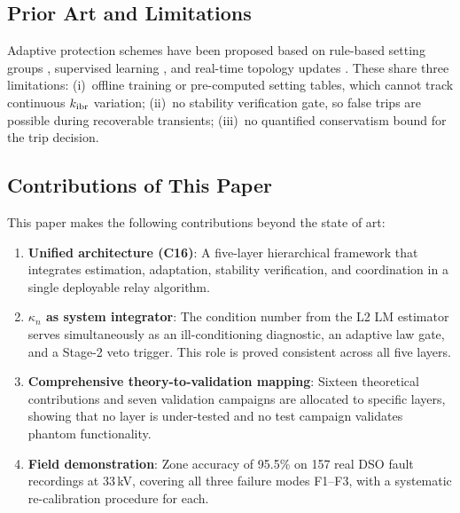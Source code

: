 \documentclass[journal,twoside,10pt]{IEEEtran}
\newcommand{\kappan}{\kappa_{n}}
\newcommand{\kibr}{k_{\rm ibr}}
\begin{document}
\subsection{Prior Art and Limitations}

Adaptive protection schemes have been proposed based on rule-based
setting groups \cite{saldarriaga2020challenges}, supervised learning
\cite{pan2020deep}, and real-time topology updates
\cite{dewadasa2011protection}.  These share three limitations:
(i)~offline training or pre-computed setting tables, which cannot
track continuous $\kibr$ variation; (ii)~no stability verification
gate, so false trips are possible during recoverable transients;
(iii)~no quantified conservatism bound for the trip decision.

\subsection{Contributions of This Paper}

This paper makes the following contributions beyond the state of art:

\begin{enumerate}
  \item \textbf{Unified architecture (C16)}: A five-layer hierarchical
        framework that integrates estimation, adaptation, stability
        verification, and coordination in a single deployable relay
        algorithm.

  \item \textbf{$\kappan$ as system integrator}: The condition number
        from the L2 LM estimator serves simultaneously as an
        ill-conditioning diagnostic, an adaptive law gate, and a
        Stage-2 veto trigger.  This role is proved consistent across
        all five layers.

  \item \textbf{Comprehensive theory-to-validation mapping}: Sixteen
        theoretical contributions and seven validation campaigns are
        allocated to specific layers, showing that no layer is
        under-tested and no test campaign validates phantom
        functionality.

  \item \textbf{Field demonstration}: Zone accuracy of 95.5\% on
        157 real DSO fault recordings at 33\,kV, covering all three
        failure modes F1--F3, with a systematic re-calibration
        procedure for each.
\end{enumerate}
\end{document}
